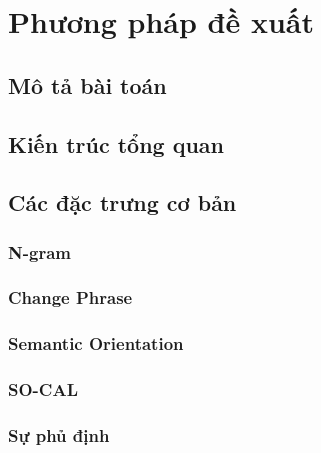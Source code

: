 \section{Phương pháp đề xuất}
\subsection{Mô tả bài toán}
\subsection{Kiến trúc tổng quan}
\subsection{Các đặc trưng cơ bản}
\subsubsection*{N-gram}
\subsubsection*{Change Phrase}
\subsubsection*{Semantic Orientation}
\subsubsection*{SO-CAL}
\subsubsection*{Sự phủ định}
